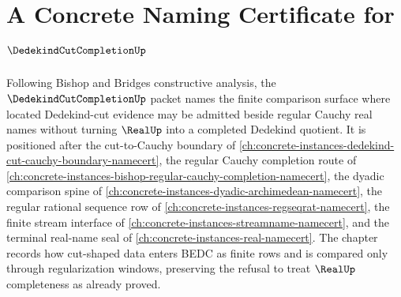 \chapter{A Concrete Naming Certificate for $\DedekindCutCompletionUp$}
\label{ch:concrete-instances-dedekind-cut-completion-namecert}

Following Bishop and Bridges constructive analysis, the $\DedekindCutCompletionUp$ packet names the finite comparison surface where located Dedekind-cut evidence may be admitted beside regular Cauchy real names without turning $\RealUp$ into a completed Dedekind quotient. It is positioned after the cut-to-Cauchy boundary of \autoref{ch:concrete-instances-dedekind-cut-cauchy-boundary-namecert}, the regular Cauchy completion route of \autoref{ch:concrete-instances-bishop-regular-cauchy-completion-namecert}, the dyadic comparison spine of \autoref{ch:concrete-instances-dyadic-archimedean-namecert}, the regular rational sequence row of \autoref{ch:concrete-instances-regseqrat-namecert}, the finite stream interface of \autoref{ch:concrete-instances-streamname-namecert}, and the terminal real-name seal of \autoref{ch:concrete-instances-real-namecert}. The chapter records how cut-shaped data enters BEDC as finite rows and is compared only through regularization windows, preserving the refusal to treat $\RealUp$ completeness as already proved.

